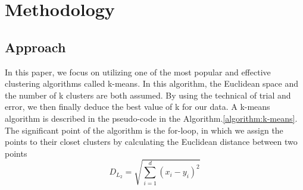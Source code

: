 \documentclass[journal]{IEEEtran}
\begin{document}
%




\section{Methodology}
\subsection{Approach}

In this paper, we focus on utilizing one of the most popular and effective clustering algorithms called k-means. In this algorithm, the Euclidean space and the number of k clusters are both assumed. By using the technical of trial and error, we then finally deduce the best value of k for our data. A k-means algorithm is described in the pseudo-code in the Algorithm.\ref{algorithm:k-means}. The significant point of the algorithm is the for-loop, in which we assign the points to their closet clusters by calculating the Euclidean distance between two points
\begin{equation}
	D_{L_2} = \sqrt{\sum_{i=1}^{d} (x_i - y_i)^2}
\end{equation}
\end{document}
